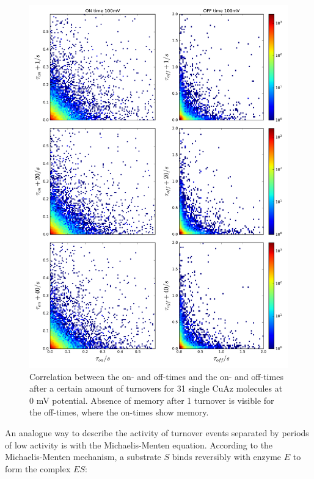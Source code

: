 \documentclass[twoside,single]{lion-msc}
\begin{document}
\begin{figure}[ht!]
\centering
\includegraphics[width=.9\textwidth]{100mv_plus100}
\caption{Correlation between the on- and off-times and the on- and off-times after a certain amount of turnovers for 31 single CuAz molecules at 0 mV potential. Absence of memory after 1 turnover is visible for the off-times, where the on-times show memory.}
\label{on_plotjes_2}
\end{figure}

\newpage


An analogue way to describe the activity of turnover events separated by periods of low activity is with the Michaelis-Menten equation. According to the Michaelis-Menten mechanism, a substrate $S$ binds reversibly with enzyme $E$ to form the complex $ES$:
\end{document}
